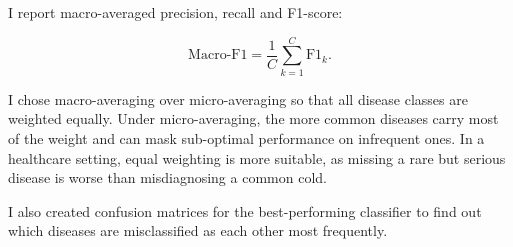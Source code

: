 I report macro-averaged precision, recall and F1-score:

\begin{equation}
\label{eq:macro}
\text{Macro-F1} = \frac{1}{C} \sum_{k=1}^{C} \text{F1}_k.
\end{equation}

I chose macro-averaging over micro-averaging so that all disease classes are weighted equally. Under micro-averaging, the more common diseases carry most of the weight and can mask sub-optimal performance on infrequent ones. In a healthcare setting, equal weighting is more suitable, as missing a rare but serious disease is worse than misdiagnosing a common cold.

I also created confusion matrices for the best-performing classifier to find out which diseases are misclassified as each other most frequently.
